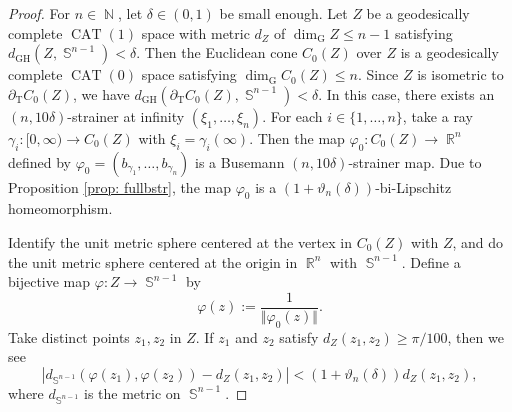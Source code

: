 \documentclass[a4paper,12pt]{amsart}
\newcommand{\CAT}{\operatorname{CAT}}
\newcommand{\R}{\operatorname{\mathbb{R}}}
\newcommand{\N}{\operatorname{\mathbb{N}}}
\newcommand{\Sph}{\operatorname{\mathbb{S}}}
\newcommand{\GH}{\operatorname{\mathrm{GH}}}
\numberwithin{equation}{section}
\theoremstyle{plain}
\theoremstyle{definition}
\theoremstyle{remark}
\begin{document}
\begin{proof}
For $n \in \N$,
let $\delta \in (0,1)$ be small enough.
Let $Z$ be a geodesically complete $\CAT(1)$ space with metric $d_Z$
of $\dim_{\mathrm{G}}Z \le n-1$
satisfying $d_{\GH} \left( Z, \Sph^{n-1} \right) < \delta$.
Then the Euclidean cone $C_0(Z)$ over $Z$
is a geodesically complete $\CAT(0)$ space
satisfying $\dim_{\mathrm{G}}C_0(Z) \le n$.
Since $Z$ is isometric to $\partial_{\mathrm{T}}C_0(Z)$,
we have 
$d_{\GH} \left( \partial_{\mathrm{T}}C_0(Z), \Sph^{n-1} \right) < \delta$.
In this case,
there exists an $(n,10\delta)$-strainer at infinity
$\left( \xi_1, \dots, \xi_n \right)$.
For each $i \in \{ 1, \dots, n \}$,
take a ray $\gamma_i \colon [0,\infty) \to C_0(Z)$
with $\xi_i = \gamma_i(\infty)$.
Then the map $\varphi_0 \colon C_0(Z) \to \R^n$
defined by 
$\varphi_0 = \left( b_{\gamma_1}, \dots, b_{\gamma_n} \right)$
is a Busemann $(n,10\delta)$-strainer map.
Due to Proposition \ref{prop: fullbstr},
the map
$\varphi_0$ is a 
$\left( 1+\vartheta_n(\delta) \right)$-bi-Lipschitz homeomorphism.

Identify the unit metric sphere centered at the vertex in $C_0(Z)$ with 
$Z$,
and do the unit metric sphere centered at the origin in $\R^n$ with 
$\Sph^{n-1}$.
Define a bijective map $\varphi \colon Z \to \Sph^{n-1}$
by
\[
\varphi(z) := \frac{1}{\Vert \varphi_0(z) \Vert}.
\]
Take distinct points $z_1, z_2$ in $Z$.
If $z_1$ and $z_2$ satisfy $d_Z(z_1,z_2) \ge \pi/100$,
then we see 
\[
\left\vert
d_{\Sph^{n-1}} \left( \varphi(z_1), \varphi(z_2) \right) - 
d_Z \left( z_1, z_2 \right) 
\right\vert
< \left( 1+ \vartheta_n(\delta) \right) d_Z \left( z_1, z_2 \right),
\]
where $d_{\Sph^{n-1}}$ is the metric on $\Sph^{n-1}$.


\end{proof}
\end{document}
